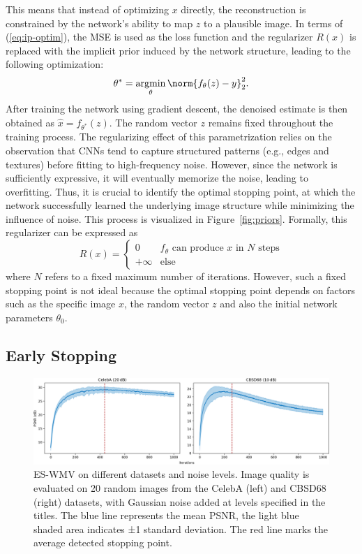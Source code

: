 This means that instead of optimizing $x$ directly, the reconstruction is constrained by the network's ability to map $z$ to a plausible image.
In terms of (\ref{eq:ip-optim}), the MSE is used as the loss function and the regularizer $R(x)$ is replaced with the implicit prior induced by the network structure, leading to the following optimization:
\begin{equation}
    \theta^* = \argmin_\theta \norm{f_\theta(z) - y}_2^2.
\end{equation}
After training the network using gradient descent, the denoised estimate is then obtained as $\hat{x} = f_{\theta^*}(z)$.
The random vector $z$ remains fixed throughout the training process.
The regularizing effect of this parametrization relies on the observation that CNNs tend to capture structured patterns (e.g., edges and textures) before fitting to high-frequency noise.
However, since the network is sufficiently expressive, it will eventually memorize the noise, leading to overfitting.
Thus, it is crucial to identify the optimal stopping point, at which the network successfully learned the underlying image structure while minimizing the influence of noise.
This process is visualized in Figure~\ref{fig:priors}.
Formally, this regularizer can be expressed as
\begin{equation}
    R(x) = \begin{cases}
        0 &\text{$f_\theta$ can produce $x$ in $N$ steps}\\
        +\infty &\text{else}
    \end{cases}
\end{equation}
where $N$ refers to a fixed maximum number of iterations.
However, such a fixed stopping point is not ideal because the optimal stopping point depends on factors such as the specific image $x$, the random vector $z$ and also the initial network parameters $\theta_0$.

\subsection{Early Stopping}

\begin{figure}[t]
    \centering
    \includegraphics[width=\textwidth]{img/fig_4.2.png}
    \caption{
        ES-WMV on different datasets and noise levels.
        Image quality is evaluated on 20 random images from the CelebA (left) and CBSD68 (right) datasets, with Gaussian noise added at levels specified in the titles.
        The blue line represents the mean PSNR, the light blue shaded area indicates ±1 standard deviation.
        The red line marks the average detected stopping point.
    }\label{fig:early-stopping}
\end{figure}


